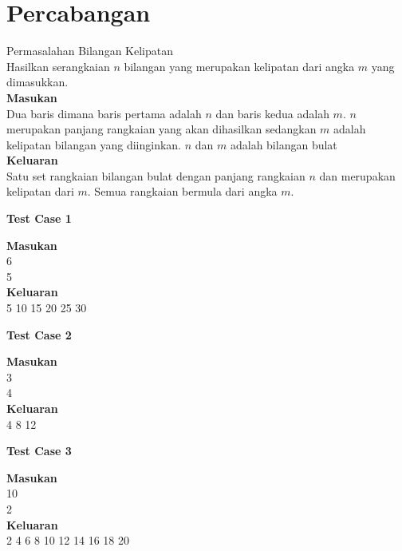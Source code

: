 \chapter{Percabangan}

\begin{permasalahan}{Permasalahan Bilangan Kelipatan}\\
\label{prob:bilanganKelipatan}
	Hasilkan serangkaian $n$ bilangan yang merupakan kelipatan dari angka $m$ yang dimasukkan.\\
	\textbf{Masukan}\\
	Dua baris dimana baris pertama adalah $n$ dan baris kedua adalah $m$. $n$ merupakan panjang rangkaian yang akan dihasilkan sedangkan $m$ adalah kelipatan bilangan yang diinginkan. $n$ dan $m$ adalah bilangan bulat\\
	\textbf{Keluaran}\\
	Satu set rangkaian bilangan bulat dengan panjang rangkaian $n$ dan merupakan kelipatan dari $m$. Semua rangkaian bermula dari angka $m$.\\
	\begin{center}
	\textbf{Test Case 1}\\
	\end{center}
	\textbf{Masukan}\\
	6\\
	5\\
	\textbf{Keluaran}\\
	5 10 15 20 25 30 \\
	\begin{center}
	\textbf{Test Case 2}\\
	\end{center}
	\textbf{Masukan}\\
	3\\
	4\\
	\textbf{Keluaran}\\
	4 8 12 \\
	\begin{center}
	\textbf{Test Case 3}\\
	\end{center}
	\textbf{Masukan}\\
	10\\
	2\\
	\textbf{Keluaran}\\
	2 4 6 8 10 12 14 16 18 20\\

\end{permasalahan}

